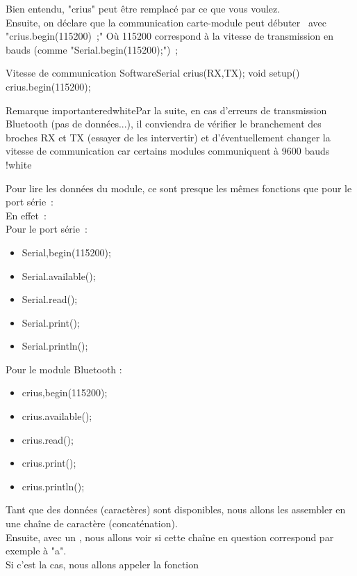 Bien entendu, "crius" peut être remplacé par ce que vous voulez. \\
Ensuite, on déclare que la communication carte-module peut débuter  avec "crius.begin(115200) ;"
Où 115200 correspond à la vitesse de transmission en bauds (comme "Serial.begin(115200);") ;

\begin{Cpp}{Vitesse de communication}
SoftwareSerial crius(RX,TX);
void setup() {
    crius.begin(115200);
}
\end{Cpp}

\begin{messageBox}{Remarque importante}{red}{white}{Par la suite, en cas d'erreurs de transmission Bluetooth (pas de données...), il conviendra de vérifier le branchement des broches RX et TX (essayer de les intervertir) et d'éventuellement changer la vitesse de communication  car certains modules communiquent à 9600 bauds !}{white}
\end{messageBox}


Pour lire les données du module, ce sont presque les mêmes fonctions que pour le port série : \\
En effet : \\

Pour le port série :	\\	

\begin{itemize}
    \item Serial,begin(115200);
    \item Serial.available();
    \item Serial.read();	
    \item Serial.print();
    \item Serial.println();
    
\end{itemize}

Pour le module Bluetooth : \\

\begin{itemize}
    \item crius,begin(115200);
    \item crius.available();
    \item crius.read();	
    \item crius.print();
    \item crius.println();
    
\end{itemize}


Tant que des données (caractères) sont disponibles, nous allons les assembler en une chaîne de caractère (concaténation). \\
Ensuite, avec un , nous allons voir si cette chaîne en question correspond par exemple à "a". \\ 
Si c'est la cas, nous allons appeler la fonction  \\

